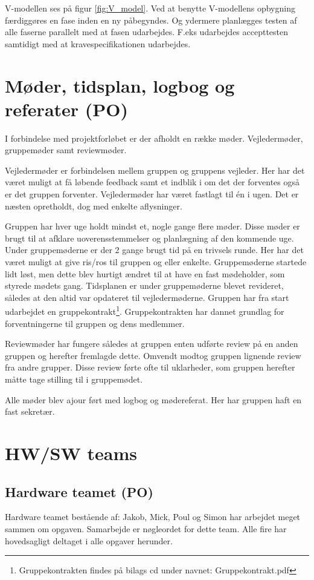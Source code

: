 V-modellen ses på figur \ref{fig:V_model}. Ved at benytte V-modellens opbygning færdiggøres en fase inden en ny påbegyndes. Og ydermere planlægges testen af alle faserne parallelt med at fasen udarbejdes. F.eks udarbejdes accepttesten samtidigt med at kravespecifikationen udarbejdes.  

\section{Møder, tidsplan, logbog og referater (PO)}

I forbindelse med projektforløbet er der afholdt en række møder. Vejledermøder, gruppemøder samt reviewmøder.

Vejledermøder er forbindelsen mellem gruppen og gruppens vejleder. Her har det været muligt at få løbende feedback samt et indblik i om det der forventes også er det gruppen forventer. Vejledermøder har været fastlagt til én i ugen. Det er næsten opretholdt, dog med enkelte aflysninger.

Gruppen har hver uge holdt mindst et, nogle gange flere møder. Disse møder er brugt til at afklare uoverensstemmelser og planlægning af den kommende uge. Under gruppemøderne er der 2 gange brugt tid på en trivsels runde. Her har det været muligt at give ris/ros til gruppen og eller enkelte. Gruppemøderne startede lidt løst, men dette blev hurtigt ændret til at have en fast mødeholder, som styrede mødets gang. Tidsplanen er under gruppemøderne blevet revideret, således at den altid var opdateret til vejledermøderne. Gruppen har fra start udarbejdet en gruppekontrakt\footnote{Gruppekontrakten findes på bilags cd under navnet: Gruppekontrakt.pdf}. Gruppekontrakten har dannet grundlag for forventningerne til gruppen og dens medlemmer.

Reviewmøder har fungere således at gruppen enten udførte review på en anden gruppen og herefter fremlagde dette. Omvendt modtog gruppen lignende review fra andre grupper. Disse review førte ofte til uklarheder, som gruppen herefter måtte tage stilling til i gruppemødet.

Alle møder blev ajour ført med logbog og mødereferat. Her har gruppen haft en fast sekretær. 

\section{HW/SW teams}

\subsection{Hardware teamet (PO)}
Hardware teamet bestående af: Jakob, Mick, Poul og Simon har arbejdet meget sammen om opgaven. Samarbejde er nøgleordet for dette team. Alle fire har hovedsagligt deltaget i alle opgaver herunder.  

